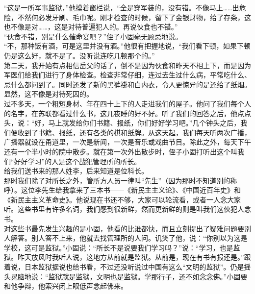 “这是一所军事监狱，”他摸着窗栏说，“全是穿军装的，没有错。不像马上……出危险，不然何必发牙刷、毛巾呢。刚才检查的时候，留下了金银财物，给了存条，这也不像是对……，这是对待普遍犯人的。再说伙食也不错。”\\

“伙食不错，别是什么催命宴吧？”侄子小固毫无顾忌地说。\\

“不，那种饭有酒，可是这里并没有酒。”他很有把握地说，“我们看下顿，如果下顿仍是这么好，就不是了。没听说连吃几顿那个的。”\\

第二天，我开始有点相信岳父的话了，倒不是因为伙食和昨天不相上下，而是因为军医们给我们进行了身体检查。检查非常仔细，连过去生过什么病，平常吃什么、忌什么都问到了。同时还发了新的黑裤褂和白内衣，令人更惊异的是还给了纸烟。显然，这不像是对待死囚的。\\

过不多天，一个粗短身材、年在四十上下的人走进我们的屋子。他问了我们每个人的名字，在苏联都看过什么书，这几夜睡的好不好。听了我们的回答之后，他点点头，说：“好，马上就发给你们书籍、报纸，你们好好学习吧。”几个钟头之后，我们便收到了书籍、报纸，还有各类的棋和纸牌。从这天起，我们每天听两次广播，广播器就设在甬道里，一次是新闻，一次是音乐或戏曲节目。除此之外，每天下午还有一个半小时的院中散步。就在第一次外出散步时，侄子小固打听出这个叫我们“好好学习”的人是这个战犯管理所的所长。\\

给我们送书来的那人姓李，后来知道是位科长。\\

那时我们除了对所长之外，管所方人员一律叫“先生”（因为那时不知道别的称呼）。这位李先生给我拿来了三本书——《新民主主义论》、《中国近百年史》和《新民主主义革命史》。他说现在书还不够，大家可以轮流看，或者一人念大家听。这些书里有许多名词，我们感到很新鲜，然而更新鲜的则是叫我们这伙犯人念书。\\

对这些书最先发生兴趣的是小固，他看的比谁都快，而且立刻提出了疑难问题要别人解答。别人答不上来，他就去找管理所的人问。讥笑了他，说：“你别以为这是学校，这可是监狱。”小固说：“所长不是说要我们学习吗？”说：“学习，也是监狱。昨天放风时我听人说，这地方从前就是监狱。从前是，现在有书有报还是。”跟着说，日本监狱据说也给书看，不过还没听说过中国有这么“文明的监狱”。仍是摇头晃脑地说：“监狱就是监狱，文明也是监狱。学那行子，还不如念念佛。”小固要和他争辩，他索兴闭上眼低声念起佛来。\\

